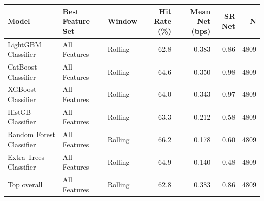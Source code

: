 \begin{tabular}{lllrrrr}
\toprule
Model & Best Feature Set & Window & Hit Rate (\%) & Mean Net (bps) & SR Net & N \\
\midrule
LightGBM Classifier & All Features & Rolling & 62.8 & 0.383 & 0.86 & 4809 \\
CatBoost Classifier & All Features & Rolling & 64.6 & 0.350 & 0.98 & 4809 \\
XGBoost Classifier & All Features & Rolling & 64.0 & 0.343 & 0.97 & 4809 \\
HistGB Classifier & All Features & Rolling & 63.3 & 0.212 & 0.58 & 4809 \\
Random Forest Classifier & All Features & Rolling & 66.2 & 0.178 & 0.60 & 4809 \\
Extra Trees Classifier & All Features & Rolling & 64.9 & 0.140 & 0.48 & 4809 \\
\midrule
Top overall & All Features & Rolling & 62.8 & 0.383 & 0.86 & 4809 \\
\bottomrule
\end{tabular}
